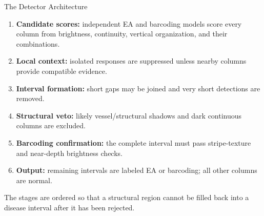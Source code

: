 \documentclass[aspectratio=169]{beamer}
\begin{document}
\begin{frame}{The Detector Architecture}

\begin{enumerate}
    \item \textbf{Candidate scores:} independent EA and barcoding models score
    every column from brightness, continuity, vertical organization, and their
    combinations.
    \item \textbf{Local context:} isolated responses are suppressed unless
    nearby columns provide compatible evidence.
    \item \textbf{Interval formation:} short gaps may be joined and very short
    detections are removed.
    \item \textbf{Structural veto:} likely vessel/structural shadows and dark
    continuous columns are excluded.
    \item \textbf{Barcoding confirmation:} the complete interval must pass
    stripe-texture and near-depth brightness checks.
    \item \textbf{Output:} remaining intervals are labeled EA or barcoding;
    all other columns are normal.
\end{enumerate}

The stages are ordered so that a structural region cannot be filled back into
a disease interval after it has been rejected.

\end{frame}
\end{document}
